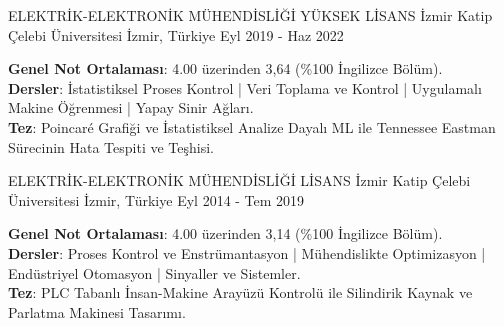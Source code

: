 

\begin{cventries}

  \cventry
    {ELEKTRİK-ELEKTRONİK MÜHENDİSLİĞİ YÜKSEK LİSANS} %
    {İzmir Katip Çelebi Üniversitesi} %
    {İzmir, Türkiye} %
    {Eyl 2019 - Haz 2022} %
    {
      \begin{cvitems} %
        \textbf{Genel Not Ortalaması}: 4.00 üzerinden 3,64 (\%100 İngilizce Bölüm).\\
        \textbf{Dersler}: İstatistiksel Proses Kontrol | Veri Toplama ve Kontrol | Uygulamalı Makine Öğrenmesi | Yapay Sinir Ağları.\\
        \textbf{Tez}: Poincaré Grafiği ve İstatistiksel Analize Dayalı ML ile Tennessee Eastman Sürecinin Hata Tespiti ve Teşhisi.
      \end{cvitems}
    }

  \cventry
    {ELEKTRİK-ELEKTRONİK MÜHENDİSLİĞİ LİSANS} %
    {İzmir Katip Çelebi Üniversitesi} %
    {İzmir, Türkiye} %
    {Eyl 2014 - Tem 2019} %
    {
      \begin{cvitems} %
        \textbf{Genel Not Ortalaması}: 4.00 üzerinden 3,14 (\%100 İngilizce Bölüm).\\
        \textbf{Dersler}: Proses Kontrol ve Enstrümantasyon | Mühendislikte Optimizasyon | Endüstriyel Otomasyon | Sinyaller ve Sistemler.\\
        \textbf{Tez}: PLC Tabanlı İnsan-Makine Arayüzü Kontrolü ile Silindirik Kaynak ve Parlatma Makinesi Tasarımı.
      \end{cvitems}
    }

\end{cventries}
